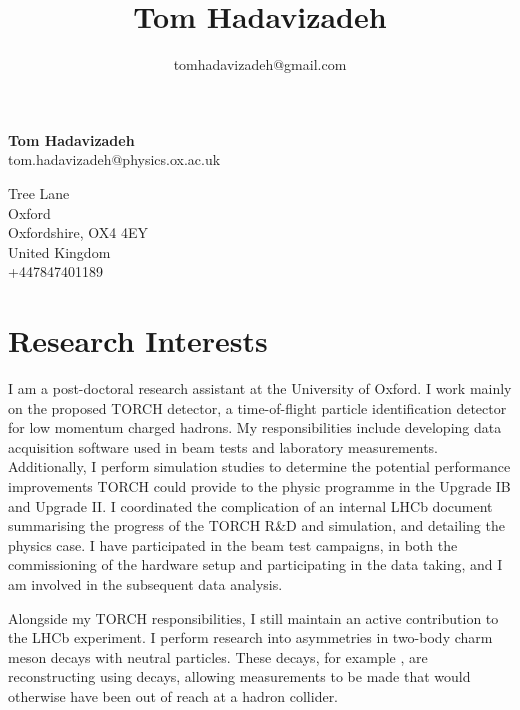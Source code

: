 \documentclass[11pt,a4paper]{article}
\title{\bfseries\Huge Tom Hadavizadeh}
\author{tomhadavizadeh@gmail.com}
\begin{document}
\begin{minipage}[ht]{0.70\textwidth}
{\bfseries\Huge Tom Hadavizadeh}\\[10pt]
{\Large tom.hadavizadeh@physics.ox.ac.uk}\\


\end{minipage}
\begin{minipage}[ht]{0.30\textwidth}
{ Tree Lane\\
Oxford\\
Oxfordshire, OX4 4EY\\
United Kingdom\\
+447847401189\\}
\end{minipage}


\section*{Research Interests}
I am a post-doctoral research assistant at the University of Oxford. I work mainly on the proposed TORCH detector, a time-of-flight particle identification detector for low momentum charged hadrons. My responsibilities include developing data acquisition software used in beam tests and laboratory measurements. Additionally, I perform simulation studies to determine the potential performance improvements TORCH could provide to the \lhcb physic programme in the Upgrade IB and Upgrade II. I coordinated the complication of an internal LHCb document summarising the progress of the TORCH R\&D and simulation, and detailing the physics case.
 I have participated in the beam test campaigns, in both the commissioning of the hardware setup and participating in the data taking, and I am involved in the subsequent data analysis.

 Alongside my TORCH responsibilities, I still maintain an active contribution to the LHCb experiment. I perform research into \CP asymmetries in two-body charm meson decays with neutral particles. These decays, for example \decay{\Dp}{\pip\piz}, are reconstructing using \decay{\piz}{\ep\en\gamma} decays, allowing measurements to be made that would otherwise have been out of reach at a hadron collider.      


\end{document}
